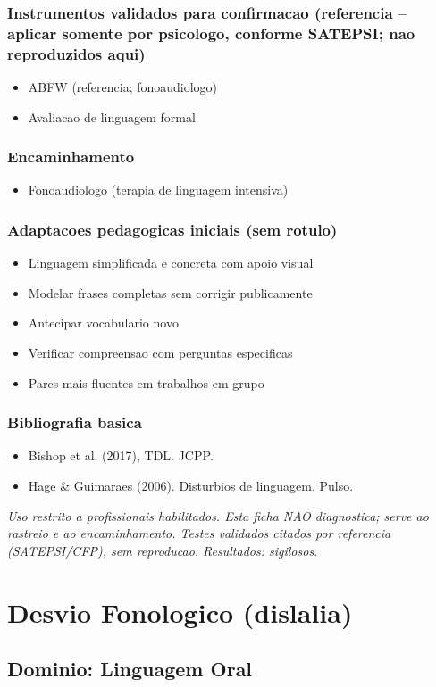 \documentclass[a4paper,11pt]{book}
\newcommand{\avisolegal}{\par\medskip\noindent\footnotesize\itshape
\color{cinza}Uso restrito a profissionais habilitados. Esta ficha NAO diagnostica;
serve ao rastreio e ao encaminhamento. Testes validados citados por referencia
(SATEPSI/CFP), sem reproducao. Resultados: sigilosos.\color{black}\par}
\begin{document}
\subsection*{Instrumentos validados para confirmacao (referencia -- aplicar somente por psicologo, conforme SATEPSI; nao reproduzidos aqui)}
\begin{itemize}
\item ABFW (referencia; fonoaudiologo)
\item Avaliacao de linguagem formal
\end{itemize}
\subsection*{Encaminhamento}
\begin{itemize}
\item Fonoaudiologo (terapia de linguagem intensiva)
\end{itemize}
\subsection*{Adaptacoes pedagogicas iniciais (sem rotulo)}
\begin{itemize}
\item Linguagem simplificada e concreta com apoio visual
\item Modelar frases completas sem corrigir publicamente
\item Antecipar vocabulario novo
\item Verificar compreensao com perguntas especificas
\item Pares mais fluentes em trabalhos em grupo
\end{itemize}
\subsection*{Bibliografia basica}
\begin{itemize}
\item Bishop et al. (2017), TDL. JCPP.
\item Hage \& Guimaraes (2006). Disturbios de linguagem. Pulso.
\end{itemize}
\avisolegal


\chapter{Desvio Fonologico (dislalia)}
\section*{Dominio: Linguagem Oral}
\end{document}
